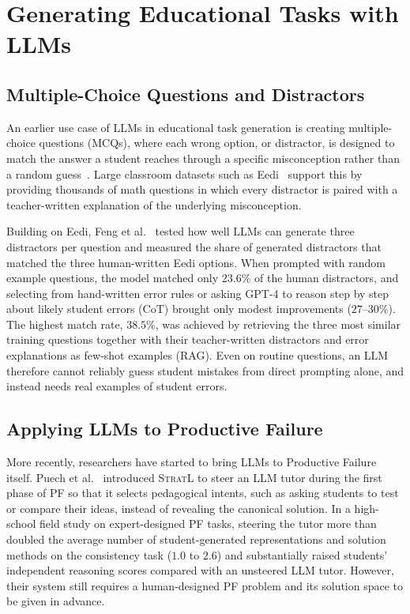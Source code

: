 \section{Generating Educational Tasks with LLMs}
\label{sec:bg-llm-math}

\subsection{Multiple-Choice Questions and Distractors}
\label{subsec:bg-llm-mcq}
An earlier use case of LLMs in educational task generation is creating multiple-choice questions (MCQs), where each wrong option, or distractor, is designed to match the answer a student reaches through a specific misconception rather than a random guess~\cite{alhazmi2024}. Large classroom datasets such as Eedi~\cite{wang2021eedi} support this by providing thousands of math questions in which every distractor is paired with a teacher-written explanation of the underlying misconception.

Building on Eedi, Feng et al.~\cite{feng2024} tested how well LLMs can generate three distractors per question and measured the share of generated distractors that matched the three human-written Eedi options. When prompted with random example questions, the model matched only $23.6\%$ of the human distractors, and selecting from hand-written error rules or asking GPT-4 to reason step by step about likely student errors (CoT) brought only modest improvements ($27\text{--}30\%$). The highest match rate, $38.5\%$, was achieved by retrieving the three most similar training questions together with their teacher-written distractors and error explanations as few-shot examples (RAG). Even on routine questions, an LLM therefore cannot reliably guess student mistakes from direct prompting alone, and instead needs real examples of student errors.

\subsection{Applying LLMs to Productive Failure}
\label{subsec:bg-llm-pf}
More recently, researchers have started to bring LLMs to Productive Failure itself. Puech et al.~\cite{puech2025} introduced \textsc{StratL} to steer an LLM tutor during the first phase of PF so that it selects pedagogical intents, such as asking students to test or compare their ideas, instead of revealing the canonical solution. In a high-school field study on expert-designed PF tasks, steering the tutor more than doubled the average number of student-generated representations and solution methods on the consistency task ($1.0$ to $2.6$) and substantially raised students' independent reasoning scores compared with an unsteered LLM tutor. However, their system still requires a human-designed PF problem and its solution space to be given in advance.

